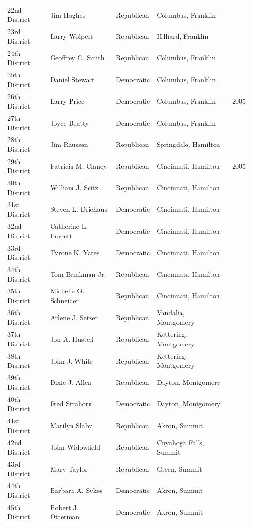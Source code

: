 \documentclass{article}
\begin{document}
\begin{tabular}{lllll}
22nd District & Jim Hughes & Republican & Columbus, Franklin &  \\
23rd District & Larry Wolpert & Republican & Hilliard, Franklin &  \\
24th District & Geoffrey C. Smith & Republican & Columbus, Franklin &  \\
25th District & Daniel Stewart & Democratic & Columbus, Franklin &  \\
26th District & Larry Price & Democratic & Columbus, Franklin & -2005 \\
27th District & Joyce Beatty & Democratic & Columbus, Franklin &  \\
28th District & Jim Raussen & Republican & Springdale, Hamilton &  \\
29th District & Patricia M. Clancy & Republican & Cincinnati, Hamilton & -2005 \\
30th District & William J. Seitz & Republican & Cincinnati, Hamilton &  \\
31st District & Steven L. Driehaus & Democratic & Cincinnati, Hamilton &  \\
32nd District & Catherine L. Barrett & Democratic & Cincinnati, Hamilton &  \\
33rd District & Tyrone K. Yates & Democratic & Cincinnati, Hamilton &  \\
34th District & Tom Brinkman Jr. & Republican & Cincinnati, Hamilton &  \\
35th District & Michelle G. Schneider & Republican & Cincinnati, Hamilton &  \\
36th District & Arlene J. Setzer & Republican & Vandalia, Montgomery &  \\
37th District & Jon A. Husted & Republican & Kettering, Montgomery &  \\
38th District & John J. White & Republican & Kettering, Montgomery &  \\
39th District & Dixie J. Allen & Republican & Dayton, Montgomery &  \\
40th District & Fred Strahorn & Democratic & Dayton, Montgomery &  \\
41st District & Marilyn Slaby & Republican & Akron, Summit &  \\
42nd District & John Widowfield & Republican & Cuyahoga Falls, Summit &  \\
43rd District & Mary Taylor & Republican & Green, Summit &  \\
44th District & Barbara A. Sykes & Democratic & Akron, Summit &  \\
45th District & Robert J. Otterman & Democratic & Akron, Summit &  \\

\end{tabular}
\end{document}
